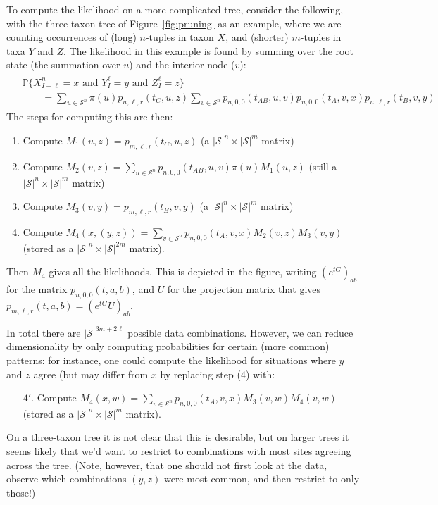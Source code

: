 \documentclass{article}
\renewcommand{\P}{\mathbb{P}}
\newcommand{\calS}{\mathcal{S}}  %
\theoremstyle{plain}
\theoremstyle{definition}
\begin{document}
To compute the likelihood on a more complicated tree, consider the following,
with the three-taxon tree of Figure~\ref{fig:pruning} as an example,
where we are counting occurrences of (long) $n$-tuples in taxon $X$,
and (shorter) $m$-tuples in taxa $Y$ and $Z$.
The likelihood in this example is found by summing over the root state (the summation over $u$)
and the interior node ($v$):
\begin{align} \label{eqn:three_taxa_likelihood}
  \begin{split}
    & \P\{X_{I-\ell}^{n}=x \text{ and } Y_I^\ell=y \text{ and } Z_I^\ell=z \} \\
    &\qquad
      =
      \sum_{u \in \calS^{n}} \pi(u) p_{n,\ell,r}(t_C,u,z)
      \sum_{v \in \calS^{n}} p_{n,0,0}(t_{AB},u,v) p_{n,0,0}(t_{A},v,x) p_{n,\ell,r}(t_B,v,y)
  \end{split}
\end{align}
The steps for computing this are then:
\begin{enumerate}

  \item Compute $M_1(u,z) = p_{m,\ell,r}(t_C,u,z)$ (a $|\calS|^{n} \times |\calS|^m$ matrix)

  \item Compute $M_2(v,z) = \sum_{u \in \calS^{n}}  p_{n,0,0}(t_{AB},u,v) \pi(u) M_1(u,z)$ (still a $|\calS|^{n} \times |\calS|^m$ matrix)

  \item Compute $M_3(v,y) = p_{m,\ell,r}(t_B,v,y)$ (a $|\calS|^{n} \times |\calS|^m$ matrix)

  \item Compute $M_4(x,(y,z)) = \sum_{v \in \calS^{n}} p_{n,0,0}(t_{A},v,x) M_2(v,z) M_3(v,y)$ (stored as a $|\calS|^{n} \times |\calS|^{2m}$ matrix).

\end{enumerate}
Then $M_4$ gives all the likelihoods.
This is depicted in the figure, writing $\left(e^{tG}\right)_{ab}$ for the matrix $p_{n,0,0}(t,a,b)$,
and $U$ for the projection matrix that gives $p_{m,\ell,r}(t,a,b) = \left( e^{tG} U\right)_{ab}$.

In total there are $|\calS|^{3m+2\ell}$ possible data combinations.
However, we can reduce dimensionality by only computing probabilities
for certain (more common) patterns: for instance,
one could compute the likelihood for situations where $y$ and $z$ agree (but may differ from $x$
by replacing step (4) with:
\begin{enumerate}

  \item[$4'$.] Compute $M_4(x,w) = \sum_{v \in \calS^{n}} p_{n,0,0}(t_{A},v,x) M_3(v,w) M_4(v,w)$ (stored as a $|\calS|^{n} \times |\calS|^{m}$ matrix).

\end{enumerate}
On a three-taxon tree it is not clear that this is desirable,
but on larger trees it seems likely that we'd want to restrict to combinations with most sites agreeing across the tree.
(Note, however, that one should not first look at the data, observe which combinations $(y,z)$ were most common, and then restrict to only those!)
\end{document}
